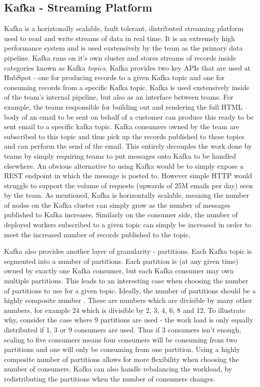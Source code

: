 \subsection{Kafka - Streaming Platform}\label{sec:kafka}
Kafka \cite{kafka} is a horiztonally scalable, fault tolerant, distributed streaming platform used to read and write streams of data in real time. It is an extremely high performance system and is used exstensively by the \team{} team as the primary data pipeline. Kafka runs on it's own cluster and stores streams of records inside categories known as Kafka \textit{topics}. Kafka provides two key APIs that are used at HubSpot - one for producing records to a given Kafka topic and one for consuming records from a specific Kafka topic. Kafka is used exstensively inside of the team's internal pipeline, but also as an interface between teams. For example, the teams responsible for building out and rendering the full HTML body of an email to be sent on behalf of a customer can produce this ready to be sent email to a specific kafka topic. Kafka consumers owned by the \team{} team are subscribed to this topic and thus pick up the records published to these topics and can perform the send of the email. This entirely decouples the work done by teams by simply requiring teams to put messages onto Kafka to be handled elsewhere. An obvious alternative to using Kafka would be to simply expose a REST endpoint in which the message is posted to. However simple HTTP would struggle to support the volume of requests (upwards of 25M emails per day) seen by the \team{} team. As mentioned, Kafka is horizontally scalable, meaning the number of nodes on the Kafka cluster can simply grow as the number of messages published to Kafka increases. Similarly on the consumer side, the number of deployed workers subscribed to a given topic can simply be increased in order to meet the increased number of records published to the topic.

Kafka also provides another layer of granularity - partitions. Each Kafka topic is segmented into a number of partitions. Each partition is (at any given time) owned by exactly one Kafka consumer, but each Kafka consumer may own multiple partitions. This leads to an interesting case when choosing the number of partitions to use for a given topic. Ideally, the number of partitions should be a highly composite number \cite {highlyCompositeNumbers}. These are numbers which are divisible by many other numbers, for example 24 which is divisible by 2, 3, 4, 6, 8 and 12. To illustrate why, consider the case where 9 partitions are used - the work load is only equally distributed if 1, 3 or 9 consumers are used. Thus if 3 consumers isn't enough, scaling to five consumers means four consumers will be consuming from two partitions and one will only be consuming from one partition. Using a highly composite number of partitions allows for more flexibility when choosing the number of consumers. Kafka can also handle rebalancing the workload, by redistributing the partitions when the number of consumers changes. 

